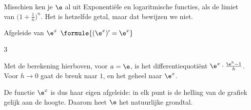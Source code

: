 Misschien ken je $\e$ al uit Exponentiële en logaritmische functies, als de limiet van $\bigl(1 + \frac1n\bigr)^n$. Het is hetzelfde getal, maar dat bewijzen we niet.

\begin{theorie}
\begin{stelling}{Afgeleide van \texorpdfstring{$\e^x$}{e tot de x}}
$\formule{(\e^x)' = \e^x}$
\end{stelling}
\begin{alleenvoor}{3}
\begin{bewijs}
Met de berekening hierboven, voor $a = \e$, is het differentiequotiënt $\e^x \cdot \frac{\e^h - 1}{h}$. Voor $h \to 0$ gaat de breuk naar $1$, en het geheel naar $\e^x$.
\end{bewijs}
\end{alleenvoor}
\end{theorie}

De functie $\e^x$ is dus haar eigen afgeleide: in elk punt is de helling van de grafiek gelijk aan de hoogte. Daarom heet $\e$ het natuurlijke grondtal.


\begin{oefeningen}
\end{oefeningen}

